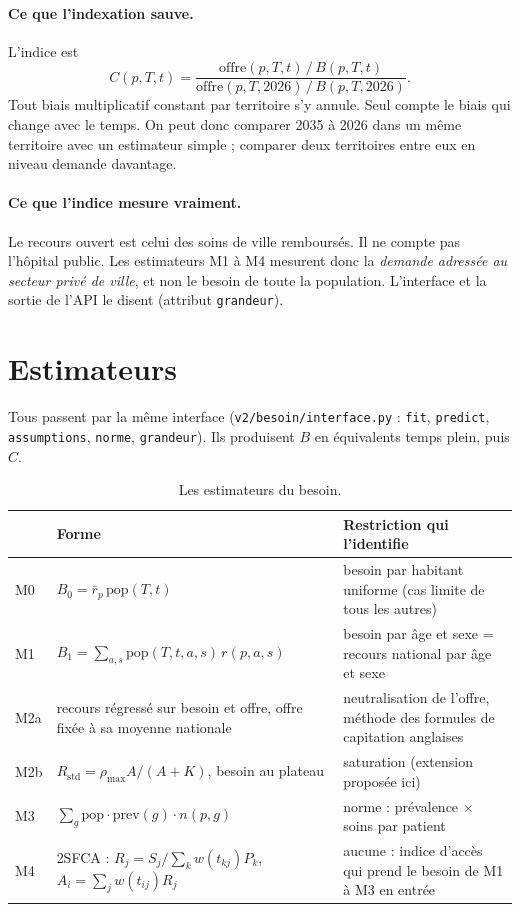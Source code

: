 \documentclass[11pt]{article}
\begin{document}
\paragraph{Ce que l'indexation sauve.} L'indice est
\[
C(p,T,t)=\frac{\text{offre}(p,T,t)\,/\,B(p,T,t)}{\text{offre}(p,T,2026)\,/\,B(p,T,2026)} .
\]
Tout biais multiplicatif constant par territoire s'y annule\derive{}. Seul compte le biais qui change avec le temps. On
peut donc comparer 2035 à 2026 dans un même territoire avec un estimateur simple ; comparer deux territoires entre eux
en niveau demande davantage.

\paragraph{Ce que l'indice mesure vraiment.} Le recours ouvert est celui des soins de ville remboursés. Il ne compte
pas l'hôpital public. Les estimateurs M1 à M4 mesurent donc la \emph{demande adressée au secteur privé de ville}, et
non le besoin de toute la population. L'interface et la sortie de l'API le disent (attribut \texttt{grandeur}).

\section{Estimateurs}\label{sec:estimateurs}
Tous passent par la même interface (\texttt{v2/besoin/interface.py} : \texttt{fit}, \texttt{predict},
\texttt{assumptions}, \texttt{norme}, \texttt{grandeur}). Ils produisent $B$ en équivalents temps plein, puis $C$.

\begin{table}[h]\centering\small
\begin{tabularx}{\linewidth}{@{}l X X@{}}
\toprule
& \textbf{Forme} & \textbf{Restriction qui l'identifie} \\
\midrule
M0 & $B_0=\bar r_p\,\mathrm{pop}(T,t)$ & besoin par habitant uniforme (cas limite de tous les autres) \\
M1 & $B_1=\sum_{a,s}\mathrm{pop}(T,t,a,s)\,r(p,a,s)$ & besoin par âge et sexe = recours national par âge et sexe \\
M2a & recours régressé sur besoin et offre, offre fixée à sa moyenne nationale & neutralisation de l'offre, méthode des formules de capitation anglaises~\citep{carrhill1994,gravelle2003} \\
M2b & $R_{\mathrm{std}}=\rho_{\max}A/(A+K)$, besoin au plateau & saturation (extension proposée ici) \\
M3 & $\sum_g \mathrm{pop}\cdot\mathrm{prev}(g)\cdot n(p,g)$ & norme : prévalence $\times$ soins par patient~\citep{birch2007,mackenzie2019} \\
M4 & 2SFCA : $R_j=S_j/\sum_k w(t_{kj})P_k$, $A_i=\sum_j w(t_{ij})R_j$ & aucune : indice d'accès qui prend le besoin de M1 à M3 en entrée~\citep{luowang2003,luo2009} \\
\bottomrule
\end{tabularx}
\caption{Les estimateurs du besoin.}
\end{table}
\end{document}
